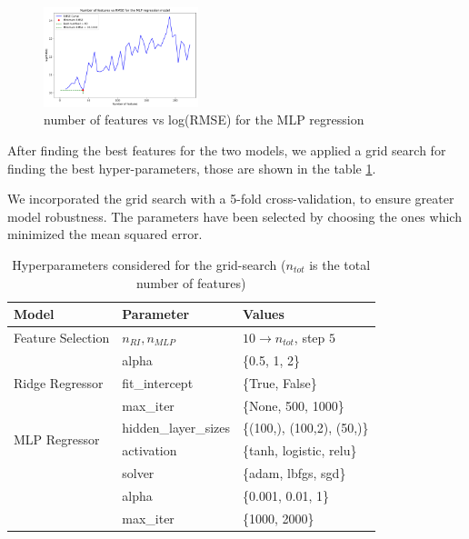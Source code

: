 \begin{itemize}
\begin{figure}
    \includegraphics[width = 0.40\textwidth]{img/rmse_mlp_new.pdf}
    \caption{number of features vs log(RMSE) for the MLP regression}
    \label{num vs rmse MLP}
    
\end{figure}

\end{itemize}

After finding the best features for the two models, we applied a grid search for finding the best hyper-parameters, those are shown in the table \ref{tab:hyperparameters}. 

We incorporated the grid search with a 5-fold cross-validation, to ensure greater model robustness. The parameters have been selected by choosing the ones which minimized the mean squared error.

\begin{table}[ht]
    \centering
    \caption{Hyperparameters considered for the grid-search ($n_{tot}$ is the total number of features)}
    \begin{tabular}{@{}lll@{}}
        \toprule
        \textbf{Model} & \textbf{Parameter} & \textbf{Values} \\ \midrule
        Feature Selection & $n_{RI},  n_{MLP}$ & $10
        \to n_{tot}$, step $5$ \\ \midrule
        \multirow{3}{*}{Ridge Regressor} 
            & alpha & \{0.5, 1, 2\} \\
            & fit\_intercept & \{True, False\} \\
            & max\_iter & \{None, 500, 1000\} \\ \midrule
        \multirow{2}{*}{MLP Regressor} 
            & hidden\_layer\_sizes & \{(100,), (100,2), (50,)\} \\
            & activation & \{tanh, logistic, relu\}\\
            & solver & \{adam, lbfgs, sgd\} \\
            & alpha & \{0.001, 0.01, 1\} \\
            & max\_iter & \{1000, 2000\} \\ \bottomrule
    \end{tabular}
    \label{tab:hyperparameters}
\end{table}

